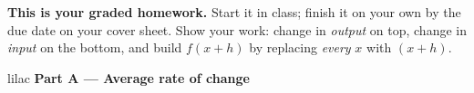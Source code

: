 \documentclass[10pt]{article}
\begin{document}

\vspace{0.12in}

\boxguard[8]
\begin{remindbox}
\small
\textbf{This is your graded homework.} Start it in class; finish it on your own by the due
date on your cover sheet. Show your work: change in \emph{output} on top, change in
\emph{input} on the bottom, and build $f(x + h)$ by replacing \emph{every} $x$ with $(x + h)$.
\end{remindbox}

\vspace{0.12in}

\begin{headlinebox}{lilac}
\textbf{\color{plum}Part A --- Average rate of change}
\end{headlinebox}
\end{document}
